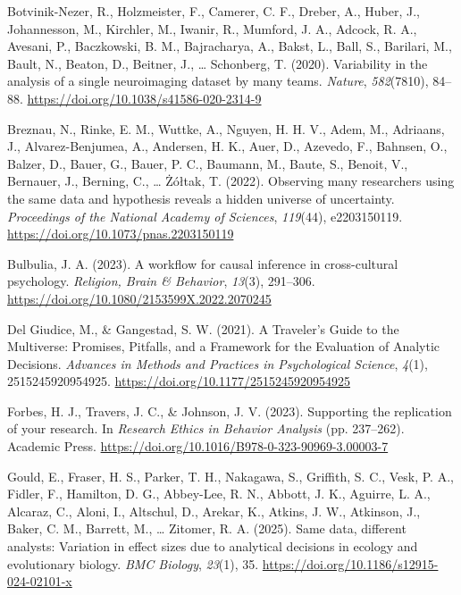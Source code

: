 \documentclass[
  man,
  floatsintext,
  longtable,
  nolmodern,
  notxfonts,
  notimes,
  colorlinks=true,linkcolor=blue,citecolor=blue,urlcolor=blue]{apa7}
\newlength{\cslhangindent}
\newenvironment{CSLReferences}[2] %
 {\begin{list}{}{%
  \setlength{\itemindent}{0pt}
  \setlength{\leftmargin}{0pt}
  \setlength{\parsep}{0pt}
  \ifodd #1
   \setlength{\leftmargin}{\cslhangindent}
   \setlength{\itemindent}{-1\cslhangindent}
  \fi
  \setlength{\itemsep}{#2\baselineskip}}}
 {\end{list}}
\begin{document}
\begin{CSLReferences}{1}{0}
Botvinik-Nezer, R., Holzmeister, F., Camerer, C. F., Dreber, A., Huber,
J., Johannesson, M., Kirchler, M., Iwanir, R., Mumford, J. A., Adcock,
R. A., Avesani, P., Baczkowski, B. M., Bajracharya, A., Bakst, L., Ball,
S., Barilari, M., Bault, N., Beaton, D., Beitner, J., \ldots{}
Schonberg, T. (2020). Variability in the analysis of a single
neuroimaging dataset by many teams. \emph{Nature}, \emph{582}(7810),
84--88. \url{https://doi.org/10.1038/s41586-020-2314-9}

Breznau, N., Rinke, E. M., Wuttke, A., Nguyen, H. H. V., Adem, M.,
Adriaans, J., Alvarez-Benjumea, A., Andersen, H. K., Auer, D., Azevedo,
F., Bahnsen, O., Balzer, D., Bauer, G., Bauer, P. C., Baumann, M.,
Baute, S., Benoit, V., Bernauer, J., Berning, C., \ldots{} Żółtak, T.
(2022). Observing many researchers using the same data and hypothesis
reveals a hidden universe of uncertainty. \emph{Proceedings of the
National Academy of Sciences}, \emph{119}(44), e2203150119.
\url{https://doi.org/10.1073/pnas.2203150119}

Bulbulia, J. A. (2023). A workflow for causal inference in
cross-cultural psychology. \emph{Religion, Brain \& Behavior},
\emph{13}(3), 291--306.
\url{https://doi.org/10.1080/2153599X.2022.2070245}

Del Giudice, M., \& Gangestad, S. W. (2021). A {Traveler}'s {Guide} to
the {Multiverse}: {Promises}, {Pitfalls}, and a {Framework} for the
{Evaluation} of {Analytic} {Decisions}. \emph{Advances in Methods and
Practices in Psychological Science}, \emph{4}(1), 2515245920954925.
\url{https://doi.org/10.1177/2515245920954925}

Forbes, H. J., Travers, J. C., \& Johnson, J. V. (2023). Supporting the
replication of your research. In \emph{Research {Ethics} in {Behavior}
{Analysis}} (pp. 237--262). Academic Press.
\url{https://doi.org/10.1016/B978-0-323-90969-3.00003-7}

Gould, E., Fraser, H. S., Parker, T. H., Nakagawa, S., Griffith, S. C.,
Vesk, P. A., Fidler, F., Hamilton, D. G., Abbey-Lee, R. N., Abbott, J.
K., Aguirre, L. A., Alcaraz, C., Aloni, I., Altschul, D., Arekar, K.,
Atkins, J. W., Atkinson, J., Baker, C. M., Barrett, M., \ldots{}
Zitomer, R. A. (2025). Same data, different analysts: Variation in
effect sizes due to analytical decisions in ecology and evolutionary
biology. \emph{BMC Biology}, \emph{23}(1), 35.
\url{https://doi.org/10.1186/s12915-024-02101-x}


\end{CSLReferences}
\end{document}
